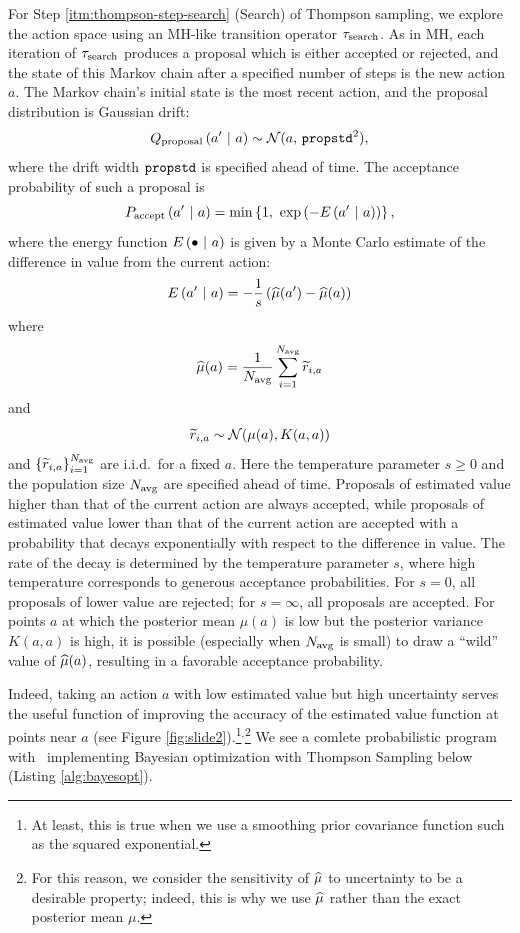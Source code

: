 For Step \ref{itm:thompson-step-search} (Search) of Thompson sampling, we
explore the action space using an MH-like transition operator $\tau_{\textrm{search}}$.
As in MH, each iteration of $\tau_{\textrm{search}}$ produces a proposal which is either
accepted or rejected, and the state of this Markov chain after a specified
number of steps is the new action $a$.  The Markov chain's initial state is the
most recent action, and the proposal distribution is Gaussian drift:
\[ Q_{\textrm{proposal}}\left( a' \ \middle\vert\  a \right) \sim \mathcal{N}(a,\,\texttt{propstd}^2), \]
where the drift width $\texttt{propstd}$ is specified ahead of time.  The acceptance
probability of such a proposal is
\[ P_\accept\pn{a' \mvert a} = \min\br{1,\ \exp\pn{-E\pn{a' \mvert a}}}, \]
where the energy function $E\left( \bullet \ \middle\vert\  a \right)$ is given by a Monte Carlo
estimate of the difference in value from the current action:
\[ E\left( a' \ \middle\vert\  a \right) = -\frac1s \left( \widehat{\mu}(a') - \widehat{\mu}(a) \right) \]
where
\[ \widehat{\mu}(a) = \frac{1}{N_{\textrm{avg}}} \sum_{i=1}^{N_{\textrm{avg}}} \widetilde{r}_{i,a} \]
and
\[ \widetilde{r}_{i,a} \sim \mathcal{N}(\mu(a), K(a,a)) \]
and $\left\{ \widetilde{r}_{i,a} \right\}_{i=1}^{N_{\textrm{avg}}}$ are i.i.d.\ for a fixed $a$.
Here the temperature parameter $s \geq 0$ and the population size $N_{\textrm{avg}}$ are
specified ahead of time.  Proposals of estimated value higher than that of the current action are
always accepted, while proposals of estimated value lower than that of the
current action are accepted with a probability that decays exponentially
with respect to the difference in value.
The rate of the decay is determined by the temperature parameter $s$,
where high temperature corresponds to generous acceptance probabilities.
For $s=0$, all proposals of lower value are rejected; for $s=\infty$, all
proposals are accepted.
For points $a$ at which the posterior mean $\mu(a)$ is low but the
posterior variance $K(a,a)$ is high, it is possible (especially when
$N_{\textrm{avg}}$ is small) to draw a ``wild'' value of $\widehat{\mu}(a)$, resulting in a
favorable acceptance probability.



Indeed, taking an action $a$ with low estimated value but high uncertainty
serves the useful function of improving the accuracy of the estimated value
function at points near $a$ (see Figure \ref{fig:slide2}).\footnote{
  At least, this is true when we use a smoothing prior covariance function such
  as the squared exponential.
}$^,$\footnote{
  For this reason, we consider the sensitivity of $\widehat{\mu}$ to uncertainty to be
  a desirable property; indeed, this is why we use $\widehat{\mu}$ rather than the
  exact posterior mean $\mu$.
}
We see a comlete probabilistic program with \gpmem\ implementing Bayesian optimization
with Thompson Sampling below (Listing \ref{alg:bayesopt}).
 


